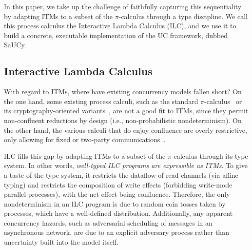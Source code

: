 In this paper, we take up the challenge of faithfully capturing this
sequentiality by adapting ITMs to a subset of the $\pi$-calculus through a type
discipline. We call this process calculus the Interactive Lambda Calculus (ILC),
and we use it to build a concrete, executable implementation of the UC
framework, dubbed SaUCy.


\subsection{Interactive Lambda Calculus}

With regard to ITMs, where have existing concurrency models fallen short? On the
one hand, some existing process calculi, such as the standard
$\pi$-calculus~\cite{milner1999communicating} or its cryptography-oriented
variants~\cite{abadi1999calculus, abadi2001mobile, lincoln1998probabilistic},
are not a good fit to ITMs, since they permit non-confluent reductions by design
(i.e., non-probabilistic nondeterminism).
On the other hand, the various calculi that do enjoy confluence are overly
restrictive, only allowing for fixed or two-party
communications~\cite{kobayashi1999linearity,bohl2016symbolic,fowler2018session}.

ILC fills this gap by adapting ITMs to a subset of the $\pi$-calculus through its
type system. In other words, \emph{well-typed ILC programs are expressible as
  ITMs}. To give a taste of the type system, it restricts the dataflow of read
channels (via affine typing) and restricts the composition of write effects
(forbidding write-mode parallel processes), with the net effect being
confluence. Therefore, the only nondeterminism in an ILC program is due to
random coin tosses taken by processes, which have a well-defined
distribution. Additionally, any apparent concurrency hazards, such as
adversarial scheduling of messages in an asynchronous network, are due to an
explicit adversary process rather than uncertainty built into the model itself.


